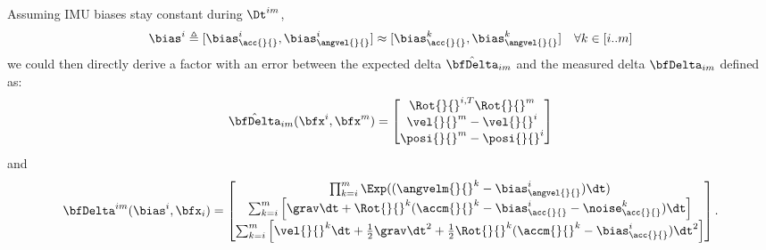 Assuming IMU biases stay constant during $\Dt^{im}$, 
\begin{equation*}
    \bias^i \triangleq [\bias_{\acc{}{}}^i, \bias_{\angvel{}{}}^i] \approx [\bias_{\acc{}{}}^k, \bias_{\angvel{}{}}^k]  ~~~ \forall k \in [i..m]
\end{equation*}
%
we could then directly derive a factor with an error between the expected delta $\hat\bfDelta_{im}$ and the measured delta $\bfDelta_{im}$ defined as:
%
\begin{align}
    \hat\bfDelta_{im}(\bfx^i, \bfx^m) = 
    \begin{bmatrix}
    \Rot{}{}^{i,T} \Rot{}{}^{m}  \\
    \vel{}{}^{m}  - \vel{}{}^{i}  \\
    \posi{}{}^{m} - \posi{}{}^{i}
    \end{bmatrix}
\end{align}
%
and 
%
\begin{align}
    \bfDelta^{im}(\bias^i, \bfx_i) = 
    \begin{bmatrix}
    \prod_{k=i}^{m} \Exp((\angvelm{}{}^k - \bias_{\angvel{}{}}^i)\dt)  \\
    \sum_{k=i}^{m} \Big[\grav \dt + \Rot{}{}^{k}(\accm{}{}^k - \bias_{\acc{}{}}^i - \noise_{\acc{}{}}^k)\dt \Big]  \\
    \sum_{k=i}^{m} \Big[\vel{}{}^{k}\dt + \frac{1}{2}\grav \dt^2 
    + \frac{1}{2}\Rot{}{}^{k}(\accm{}{}^k - \bias_{\acc{}{}}^i)\dt^2 \Big]
    \end{bmatrix}.
    \label{eq:IMUIntim}
\end{align}

